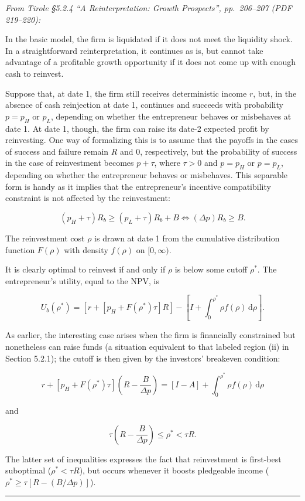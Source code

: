 \documentclass[11pt,a4paper]{article}
\newcommand{\stmtend}{\par\endgroup\nopagebreak\noindent\rule{\linewidth}{0.4pt}\par\medskip}
\begin{document}
\emph{From Tirole §5.2.4 ``A Reinterpretation: Growth Prospects'', pp.~206--207 (PDF 219--220):}

In the basic model, the firm is liquidated if it does not meet the liquidity shock. In a
straightforward reinterpretation, it continues as is, but cannot take advantage of a profitable
growth opportunity if it does not come up with enough cash to reinvest.

Suppose that, at date 1, the firm still receives deterministic income \(r\), but, in the absence of
cash reinjection at date 1, continues and succeeds with probability \(p = p_H\) or \(p_L\),
depending on whether the entrepreneur behaves or misbehaves at date 1. At date 1, though, the firm
can raise its date-2 expected profit by reinvesting. One way of formalizing this is to assume that
the payoffs in the cases of success and failure remain \(R\) and 0, respectively, but the
probability of success in the case of reinvestment becomes \(p + \tau\), where \(\tau > 0\) and
\(p = p_H\) or \(p = p_L\), depending on whether the entrepreneur behaves or misbehaves. This
separable form is handy as it implies that the entrepreneur's incentive compatibility constraint is
not affected by the reinvestment:

\[(p_H + \tau)R_b \geqslant (p_L + \tau)R_b + B \iff (\Delta p)R_b \geqslant B.\]

The reinvestment cost \(\rho\) is drawn at date 1 from the cumulative distribution function
\(F(\rho)\) with density \(f(\rho)\) on \([0, \infty)\).

It is clearly optimal to reinvest if and only if \(\rho\) is below some cutoff \(\rho^*\). The
entrepreneur's utility, equal to the NPV, is

\[U_b(\rho^*) = [r + [p_H + F(\rho^*)\tau]R] - \left[I + \int_0^{\rho^*}\rho f(\rho)\,\mathrm{d}\rho\right].\]

As earlier, the interesting case arises when the firm is financially constrained but nonetheless can
raise funds (a situation equivalent to that labeled region (ii) in Section 5.2.1); the cutoff is
then given by the investors' breakeven condition:

\[r + [p_H + F(\rho^*)\tau]\left(R - \frac{B}{\Delta p}\right) = [I - A] + \int_0^{\rho^*}\rho f(\rho)\,\mathrm{d}\rho\]

and

\[\tau\left(R - \frac{B}{\Delta p}\right) \leqslant \rho^* < \tau R.\]

The latter set of inequalities expresses the fact that reinvestment is first-best suboptimal
(\(\rho^* < \tau R\)), but occurs whenever it boosts pledgeable income
(\(\rho^* \geqslant \tau[R - (B/\Delta p)]\)).
\stmtend
\end{document}

